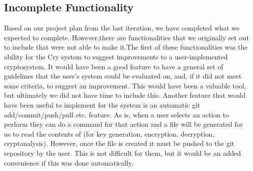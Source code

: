 \subsection{Incomplete Functionality}

Based on our project plan from the last iteration, we have completed what we
expected to complete. However,there are functionalities that we originally set
out to include that were not able to make it.The first of these functionalities
was the ability for the Cry system to suggest improvements to a user-implemented
cryptosystem. It would have been a good feature to have a general set of guidelines
that the user's system could be evaluated on, and, if it did not meet some
criteria, to suggest an improvement. This would have been a valuable tool, but
ultimately we did not have time to include this. Another feature that would have
been useful to implement for the system is an automatic git add/commit/push/pull
etc. feature. As is, when a user selects an action to perform they can do a command
for that action and a file will be generated for us to read the contents of (for
key generation, encryption, decryption, cryptanalysis). However, once the file is
created it must be pushed to the git repository by the user. This is not difficult
for them, but it would be an added convenience if this was done automatically.

